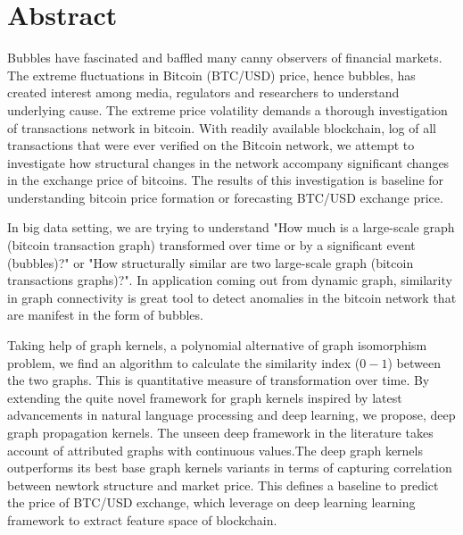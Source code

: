 {\chapter*{Abstract}}
Bubbles have fascinated and baffled many canny observers of financial markets. The  extreme fluctuations in Bitcoin (BTC/USD) price, hence bubbles, has created interest among media, regulators and researchers to understand underlying cause. The extreme price volatility demands a thorough investigation of transactions network in bitcoin. With readily available blockchain, log of all transactions that were ever verified on the Bitcoin network, we attempt to investigate how structural changes in the network accompany significant changes in the exchange price of bitcoins. The results of this investigation is baseline for understanding bitcoin price formation or forecasting BTC/USD exchange price.

In big data setting, we are trying to understand "How much is a large-scale graph (bitcoin transaction graph) transformed over time or by a significant event (bubbles)?" or "How structurally similar are two large-scale graph (bitcoin transactions graphs)?". In application coming out from dynamic graph, similarity in graph connectivity is great tool to detect
anomalies in the bitcoin network that are manifest in the form of bubbles.
 
Taking help of graph kernels, a polynomial alternative of graph isomorphism problem, we find an algorithm to calculate the similarity index ($0-1$) between the two graphs. This is quantitative measure of transformation over time. By extending the quite novel framework for graph kernels inspired by latest advancements in natural language processing and deep learning, we propose, deep graph propagation kernels. The unseen deep framework in the literature takes account of attributed graphs with continuous values.The deep graph kernels outperforms its best base graph kernels variants in terms of capturing correlation between newtork structure and market price. This defines a baseline to predict the price of BTC/USD exchange, which leverage on deep learning learning framework to extract feature space of blockchain.
 


